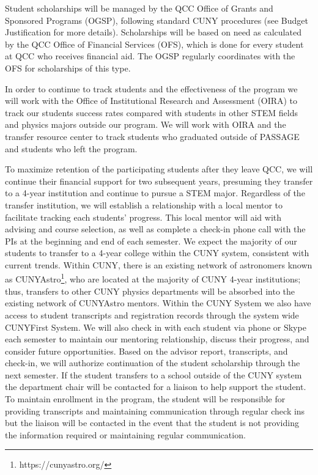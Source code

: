 \documentclass[12pt]{article}
\begin{document}
Student scholarships will be managed by the QCC Office of Grants and Sponsored Programs (OGSP), following standard CUNY procedures (see Budget Justification for more details).  Scholarships will be based on need as calculated by the QCC Office of Financial Services (OFS), which is done for every student at QCC who receives financial aid.  The OGSP regularly coordinates with the OFS for scholarships of this type.  

In order to continue to track students and the effectiveness of the program we will work with the Office of Institutional Research and Assessment (OIRA) to track our students success rates compared with students in other STEM fields and physics majors outside our program.  We will work with OIRA and the transfer resource center to track students who graduated outside of PASSAGE and students who left the program.  

To maximize retention of the participating students after they leave QCC, we will continue their financial support for two subsequent years, presuming they transfer to a 4-year institution and continue to pursue a STEM  major.  Regardless of the transfer institution, we will establish a relationship with a local mentor to facilitate tracking each students' progress.  This local mentor will aid with advising and course selection, as well as complete a check-in phone call with the PIs at the beginning and end of each semester.  We expect the majority of our students to transfer to a 4-year college within the CUNY system, consistent with current trends.  Within CUNY, there is an existing network of astronomers known as CUNYAstro\footnote{https://cunyastro.org/}, who are located at the majority of CUNY 4-year institutions; thus, transfers to other CUNY physics departments will be absorbed into the existing network of CUNYAstro  mentors.  Within the CUNY System we also have access to student transcripts and registration records through the system wide CUNYFirst System.  We will also check in with each student via phone or Skype each semester to maintain our mentoring relationship, discuss their progress, and consider future opportunities.  Based on the advisor report, transcripts, and check-in, we will authorize continuation of the student scholarship through the next semester.  If the student transfers to a school outside of the CUNY system the department chair will be contacted for a liaison to help support the student.  To maintain enrollment in the program, the student will be responsible for providing transcripts and maintaining communication through regular check ins but the liaison will be contacted in the event that the student is not providing the information required or maintaining regular communication.
\end{document}
